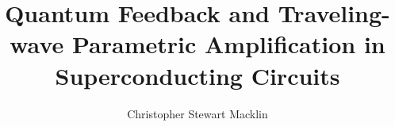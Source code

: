 \title{Quantum Feedback and Traveling-wave Parametric Amplification in Superconducting Circuits}
\author{Christopher Stewart Macklin} %
